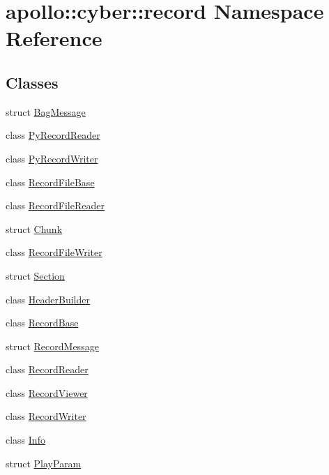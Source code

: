 \hypertarget{namespaceapollo_1_1cyber_1_1record}{\section{apollo\-:\-:cyber\-:\-:record Namespace Reference}
\label{namespaceapollo_1_1cyber_1_1record}
}
\subsection*{Classes}
\begin{DoxyCompactItemize}
\item 
struct \hyperlink{structapollo_1_1cyber_1_1record_1_1BagMessage}{Bag\-Message}
\item 
class \hyperlink{classapollo_1_1cyber_1_1record_1_1PyRecordReader}{Py\-Record\-Reader}
\item 
class \hyperlink{classapollo_1_1cyber_1_1record_1_1PyRecordWriter}{Py\-Record\-Writer}
\item 
class \hyperlink{classapollo_1_1cyber_1_1record_1_1RecordFileBase}{Record\-File\-Base}
\item 
class \hyperlink{classapollo_1_1cyber_1_1record_1_1RecordFileReader}{Record\-File\-Reader}
\item 
struct \hyperlink{structapollo_1_1cyber_1_1record_1_1Chunk}{Chunk}
\item 
class \hyperlink{classapollo_1_1cyber_1_1record_1_1RecordFileWriter}{Record\-File\-Writer}
\item 
struct \hyperlink{structapollo_1_1cyber_1_1record_1_1Section}{Section}
\item 
class \hyperlink{classapollo_1_1cyber_1_1record_1_1HeaderBuilder}{Header\-Builder}
\item 
class \hyperlink{classapollo_1_1cyber_1_1record_1_1RecordBase}{Record\-Base}
\item 
struct \hyperlink{structapollo_1_1cyber_1_1record_1_1RecordMessage}{Record\-Message}
\item 
class \hyperlink{classapollo_1_1cyber_1_1record_1_1RecordReader}{Record\-Reader}
\item 
class \hyperlink{classapollo_1_1cyber_1_1record_1_1RecordViewer}{Record\-Viewer}
\item 
class \hyperlink{classapollo_1_1cyber_1_1record_1_1RecordWriter}{Record\-Writer}
\item 
class \hyperlink{classapollo_1_1cyber_1_1record_1_1Info}{Info}
\item 
struct \hyperlink{structapollo_1_1cyber_1_1record_1_1PlayParam}{Play\-Param}

\end{DoxyCompactItemize}
